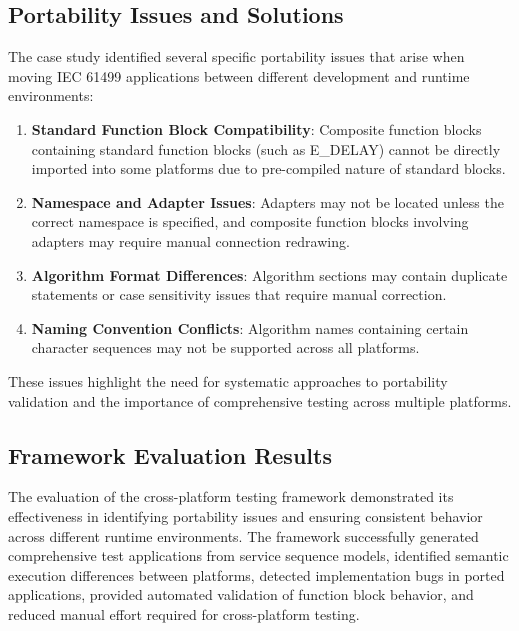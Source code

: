 \subsection{Portability Issues and Solutions}

The case study identified several specific portability issues that arise when moving IEC 61499 applications between different development and runtime environments:

\begin{enumerate}
    \item \textbf{Standard Function Block Compatibility}: Composite function blocks containing standard function blocks (such as E\_DELAY) cannot be directly imported into some platforms due to pre-compiled nature of standard blocks.
    
    \item \textbf{Namespace and Adapter Issues}: Adapters may not be located unless the correct namespace is specified, and composite function blocks involving adapters may require manual connection redrawing.
    
    \item \textbf{Algorithm Format Differences}: Algorithm sections may contain duplicate statements or case sensitivity issues that require manual correction.
    
    \item \textbf{Naming Convention Conflicts}: Algorithm names containing certain character sequences may not be supported across all platforms.
\end{enumerate}

These issues highlight the need for systematic approaches to portability validation and the importance of comprehensive testing across multiple platforms.

\subsection{Framework Evaluation Results}

The evaluation of the cross-platform testing framework demonstrated its effectiveness in identifying portability issues and ensuring consistent behavior across different runtime environments. The framework successfully generated comprehensive test applications from service sequence models, identified semantic execution differences between platforms, detected implementation bugs in ported applications, provided automated validation of function block behavior, and reduced manual effort required for cross-platform testing.

